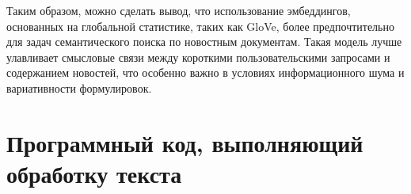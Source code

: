 \documentclass[coursework]{SCWorks}
\begin{document}
Таким образом, можно сделать вывод, что использование эмбеддингов, основанных на глобальной статистике, таких как GloVe, более предпочтительно для задач семантического поиска по новостным документам. Такая модель лучше улавливает смысловые связи между короткими пользовательскими запросами и содержанием новостей, что особенно важно в условиях информационного шума и вариативности формулировок.

% 
% 

\appendix
\section{Программный код, выполняющий обработку текста}
\label{apx:tokenization}
\end{document}
